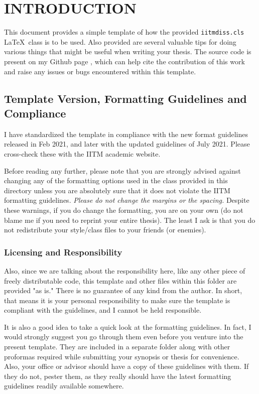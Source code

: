 \chapter{INTRODUCTION}
\label{chap:intro}

This document provides a simple template of how the provided \verb+iitmdiss.cls+ \LaTeX\ class is to be used.  Also provided are several valuable tips for doing various things that might be useful when writing your thesis. The source code is present on my Github page \citep{SyedGit2021}, which can help cite the contribution of this work and raise any issues or bugs encountered within this template.

\section{Template Version, Formatting Guidelines and Compliance}
I have standardized the template in compliance with the new format guidelines released in Feb 2021, and later with the updated guidelines of July 2021. Please cross-check these with the IITM academic website. 

Before reading any further, please note that you are strongly advised against changing any of the formatting options used in the class provided in this directory unless you are absolutely sure that it does not violate the IITM formatting guidelines.  \emph{Please do not change the margins or the spacing.}   Despite these warnings, if you do change the formatting, you are on your own (do not blame me if you need to reprint your entire
thesis). The least I ask is that you do not redistribute your style/class files to your friends (or enemies). 

\subsection{Licensing and Responsibility}
Also, since we are talking about the responsibility here, like any other piece of freely distributable code, this template and other files within this folder are provided "as is." There is no guarantee of any kind from the author. In short, that means it is your personal responsibility to make sure the template is compliant with the guidelines, and I cannot be held responsible.

It is also a good idea to take a quick look at the formatting guidelines. In fact, I would strongly suggest you go through them even before you venture into the present template. They are included in a separate folder along with other proformas required while submitting your synopsis or thesis for convenience. Also, your office or advisor should have a copy of these guidelines with them. If they do not, pester them, as they really should have the latest formatting guidelines readily available somewhere. 

